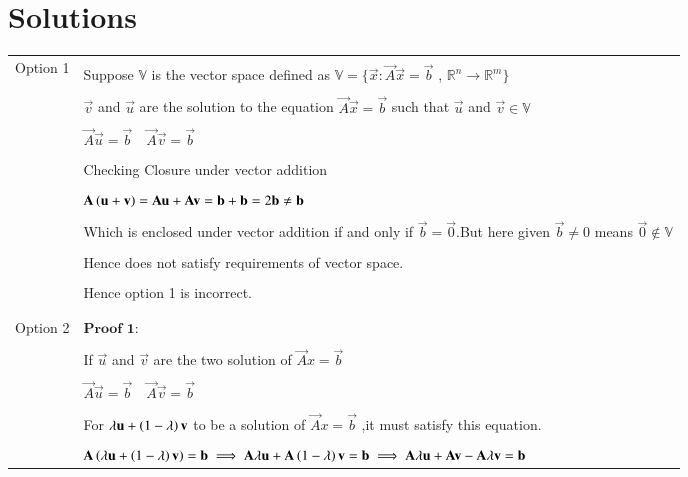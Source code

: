 \documentclass[journal,12pt]{IEEEtran}
\begin{document}
\section{\textbf{Solutions}}
\renewcommand{\thetable}{1}
\begin{longtable}{|l|l|}
\hline
\multirow{3}{*}{Option 1} & \\
&Suppose $\mathbb{V}$ is the vector space defined as $\mathbb{V}=\{\vec{x}:\vec{A}\vec{x}=\vec{b}$ , $\mathbb{R}^n\xrightarrow{}\mathbb{R}^m\}$\\
&\\
& $\vec{v}$ and $\vec{u}$ are the solution to the equation $\vec{A}\vec{x}=\vec{b}$  such that $\vec{u}$ and  $\vec{v}\in \mathbb{V}$\\
&\\
&$\vec{A}\vec{u}=\vec{b}\quad\vec{A}\vec{v}=\vec{b}$\\
&\\
&Checking Closure under vector addition\\
&\\
&$\mathbf{A}\left(\mathbf{u+v}\right)=\mathbf{A}\mathbf{u}+\mathbf{A}\mathbf{v}=\mathbf{b}+\mathbf{b}=2\mathbf{b}\neq\mathbf{b}$\\
&\\
&Which is enclosed under vector addition if and only if $\vec{b}=\vec{0}$.But here given $\vec{b}\neq0$ means $\vec{0} \not\in \mathbb{V}$\\
&\\
&Hence does not satisfy requirements of vector space.\\
&\\
&Hence option 1 is incorrect.\\
&\\
\hline
&\\
Option 2 &$\textbf{Proof 1:}$\\
&\\
&If $\vec{u}$ and $\vec{v}$ are the two solution of $\vec{A}x=\vec{b}$ \\
&\\
&$\vec{A}\vec{u}=\vec{b}\quad\vec{A}\vec{v}=\vec{b}$\\
&\\
&For $\lambda \mathbf{u}  +\left(1-\lambda\right)\mathbf{v}$ to be a solution of $\vec{A}x=\vec{b}$ ,it must satisfy this equation.\\
&\\
& $\mathbf{A}\left(\lambda\mathbf{u}  +\left(1-\lambda\right)\mathbf{v}\right)=\mathbf{b} \implies\mathbf{A}\lambda\mathbf{u} + \mathbf{A}\left(1-\lambda\right)\mathbf{v}=\mathbf{b}\implies\mathbf{A}\lambda\mathbf{u}+\mathbf{A}\mathbf{v}-\mathbf{A}\lambda\mathbf{v}=\mathbf{b}$\\

\end{longtable}
\end{document}
